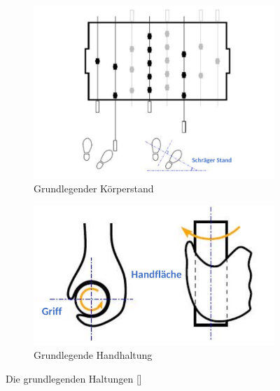 \begin{figure}
    \centering 
        \begin{subfigure}[b]{0.9\textwidth} 
            \includegraphics[width=\textwidth]{img/haltung_koerper.png} 
            \caption{Grundlegender Körperstand} 
            \label{fig:haltung:koerper} 
            \vspace{0.5cm}
        \end{subfigure} 
        \begin{subfigure}[b]{0.5\textwidth} 
            \includegraphics[width=\textwidth]{img/haltung_hand.png} 
            \caption{Grundlegende Handhaltung} 
            \label{fig:haltung:hand} 
        \end{subfigure} 
        \label{fig:haltung} 
        \caption{Die grundlegenden Haltungen [\cite{itsf_basics}]} 
\end{figure}

